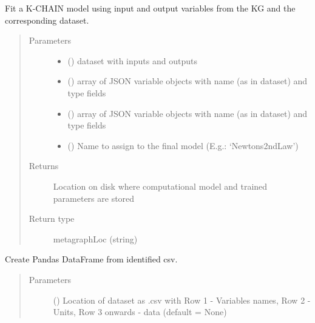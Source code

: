 \documentclass[letterpaper,10pt,english]{sphinxmanual}
\begin{document}
\begin{fulllineitems}
\begin{fulllineitems}
\label{\detokenize{index:kChain.kChainModel.fitModel}}
Fit a K-CHAIN model using input and output variables from the KG and
the corresponding dataset.
\begin{quote}\begin{description}
\item[{Parameters}] \leavevmode\begin{itemize}
\item {} 
 () \textendash{} dataset with inputs and outputs

\item {} 
 () \textendash{} array of JSON variable objects with name (as in dataset) and type fields

\item {} 
 () \textendash{} array of JSON variable objects with name (as in dataset) and type fields

\item {} 
 () \textendash{} Name to assign to the final model (E.g.: ‘Newtons2ndLaw’)

\end{itemize}

\item[{Returns}] \leavevmode
Location on disk where computational model and trained parameters are stored

\item[{Return type}] \leavevmode
metagraphLoc (string)

\end{description}\end{quote}

\end{fulllineitems}


\begin{fulllineitems}
\label{\detokenize{index:kChain.kChainModel.getDataset}}
Create Pandas DataFrame from identified csv.
\begin{quote}\begin{description}
\item[{Parameters}] \leavevmode
{} () \textendash{} Location of dataset as .csv with Row 1 - Variables names,
Row 2 - Units, Row 3 onwards - data (default = None)


\end{description}
\end{quote}
\end{fulllineitems}
\end{fulllineitems}
\end{document}
